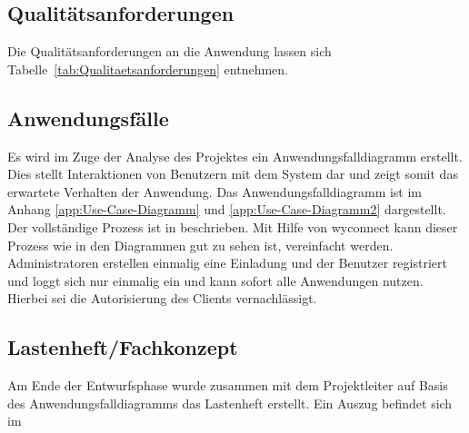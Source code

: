 \subsection{Qualitätsanforderungen}
\label{sec:Qualitaetsanforderungen}

Die Qualitätsanforderungen an die Anwendung lassen sich Tabelle~\ref{tab:Qualitaetsanforderungen} entnehmen.

\subsection{Anwendungsfälle}
\label{sec:Anwendungsfaelle}

Es wird im Zuge der Analyse des Projektes ein Anwendungsfalldiagramm erstellt. Dies stellt
Interaktionen von Benutzern mit dem System dar und zeigt somit das erwartete Verhalten der
Anwendung. Das Anwendungsfalldiagramm ist im Anhang \ref{app:Use-Case-Diagramm} und \ref{app:Use-Case-Diagramm2} dargestellt.
Der vollständige Prozess ist in  beschrieben.
Mit Hilfe von wyconnect kann dieser Prozess wie in den Diagrammen gut zu sehen ist, vereinfacht werden. Administratoren erstellen einmalig eine Einladung und der Benutzer registriert und loggt sich nur einmalig ein und kann sofort alle Anwendungen nutzen. Hierbei sei die Autorisierung des Clients vernachlässigt. 

\subsection{Lastenheft/Fachkonzept}
Am Ende der Entwurfsphase wurde zusammen mit dem Projektleiter auf Basis des Anwendungsfalldiagramms das Lastenheft erstellt. Ein Auszug befindet sich im 
